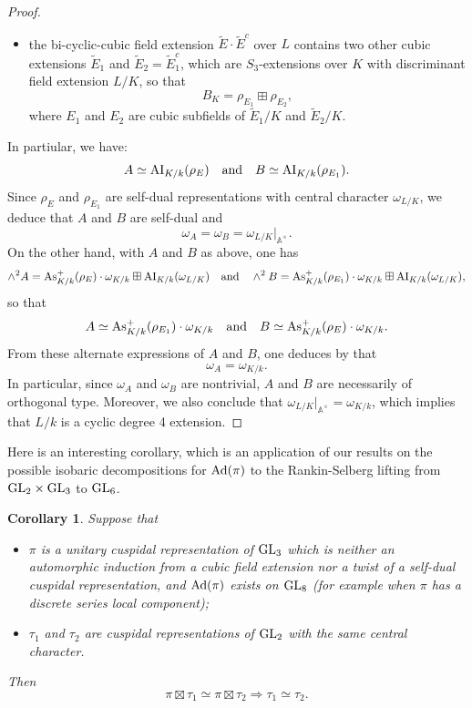 \documentclass[11pt]{amsart}
\theoremstyle{plain}
\newtheorem{cor}[equation]{Corollary}
\numberwithin{equation}{section}
\newcommand{\A}{\mathbb A}
\def\GL{{\rm GL}}
\def\A{{\mathbb A}}
\begin{document}
\begin{proof}
\begin{itemize}
\item the bi-cyclic-cubic field extension $\tilde{E} \cdot \tilde{E}^c$ over $L$ contains two other cubic extensions $\tilde{E}_1$ and $\tilde{E}_2 = \tilde{E}_1^c$, which are $S_3$-extensions over $K$ with discriminant field extension $L/K$, so that
\[  B_K = \rho_{E_1} \boxplus \rho_{E_2}, \] 
where $E_1$ and $E_2$ are cubic subfields of $\tilde{E}_1/K$ and $\tilde{E}_2 /K$.  
\end{itemize}
In partiular, we have:
\[ A \simeq {\rm AI}_{K/k}(\rho_E)  \quad \text{and} \quad B \simeq {\rm AI}_{K/k}(\rho_{E_1}). \]
Since $\rho_E$ and $\rho_{E_1}$ are self-dual representations with central character $\omega_{L/K}$, we deduce that $A$ and $B$ are self-dual and 
\[ \omega_A = \omega_B = \omega_{L/K}|_{\A^{\times}}. \]
On the other hand,  with $A$ and $B$ as above, one has \cite[proofs of Prop. 3.2 and Prop. 3.5]{AR}
\[ \wedge^2 A = {\rm As}_{K/k}^+(\rho_E) \cdot \omega_{K/k} \boxplus {\rm AI}_{K/k}(\omega_{L/K}) \quad \text{and} \quad 
\wedge^2 B = {\rm As}^+_{K/k}(\rho_{E_1}) \cdot \omega_{K/k} \boxplus {\rm AI}_{K/k}(\omega_{L/K}), \]
 so that
 \[  A \simeq {\rm As}^+_{K/k}(\rho_{E_1})  \cdot \omega_{K/k} \quad \text{and} \quad 
 B \simeq {\rm As}^+_{K/k}(\rho_E)  \cdot \omega_{K/k}. \]
 From these alternate expressions of $A$ and $B$, one deduces by \cite{Ra2}  that 
 \[ \omega_A = \omega_{K/k}. \]
 In particular, since $\omega_A$ and $\omega_B$ are nontrivial, $A$ and $B$ are necessarily of orthogonal type. 
 Moreover, we also conclude that $\omega_{L/K}|_{\A^{\times}} = \omega_{K/k}$, which implies  that $L/k$ is a cyclic degree 4 extension. 
 \end{proof}
\vskip 5pt


Here is an interesting corollary, which is an application of  our results on the possible isobaric decompositions for ${\rm Ad}(\pi)$ to the Rankin-Selberg lifting from $\GL_2 \times \GL_3$ to $\GL_6$.
\vskip 5pt


\begin{cor}
Suppose that
\begin{itemize}
\item  $\pi$ is  a unitary cuspidal representation of $\GL_3$ which is neither an automorphic induction from a cubic field extension nor a twist of a self-dual cuspidal representation, and  ${\rm Ad}(\pi)$ exists on $\GL_8$ (for example when $\pi$ has a discrete series local component);
\item $\tau_1$ and $ \tau_2$ are cuspidal representations of $\GL_2$ with the same central character. 
\end{itemize}
Then
\[  \pi \boxtimes \tau_1 \simeq \pi \boxtimes \tau_2 \Longrightarrow  \tau_1 \simeq \tau_2. \]
\end{cor}
\vskip 5pt
\end{document}

